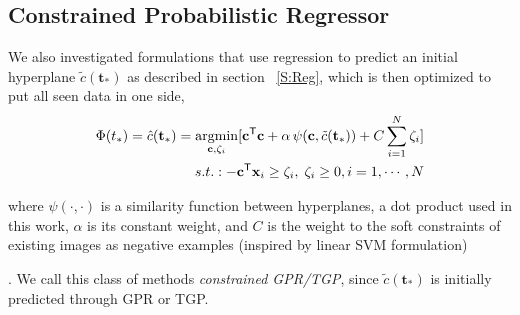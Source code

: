 \subsection{Constrained Probabilistic Regressor}
\label{S:Reg_con}
We also investigated formulations that use regression to predict an initial hyperplane  $\tilde{c}(\mathbf{t}_*)$ as described in section ~\ref{S:Reg}, which is then optimized to put all seen data in one side, \ie
\begin{equation*}
\begin{split}
 {\Phi (t_*)} = \small \hat{c}(\mathbf{t}_*) =   \underset{\mathbf{c},\zeta_i}{\operatorname{argmin }}[  \mathbf{c}^\textsf{T} \mathbf{c}  + \alpha \, \psi( \mathbf{c},\tilde{c}(\mathbf{t}_*)) + C   \sum_{i=1}^N{\zeta_i} ] \\ \; s.t.:  -\mathbf{c}^\textsf{T} {\mathbf{x}}_{i}  \geq \zeta_i , \; \zeta_i \geq 0 , i=1,\cdots,N 
\end{split}
\end{equation*}

where $\psi(\cdot,\cdot)$ is a similarity function between hyperplanes, \eg a dot product used in this work,  $\alpha$ is its constant weight, and $C$ is the weight to the soft constraints of existing images as negative examples (inspired by linear SVM formulation). We call this class of methods {\em constrained GPR/TGP}, since $\tilde{c}(\mathbf{t}_*)$ is initially predicted through GPR or TGP. 
 



